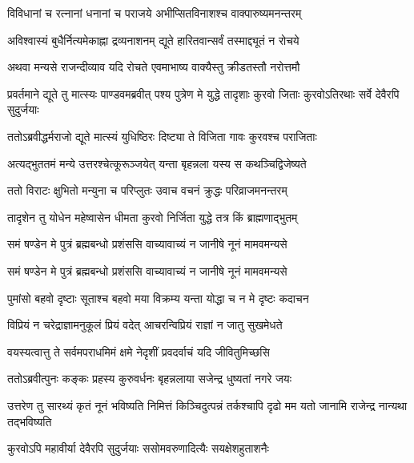 \twolineshloka
{विविधानां च रत्नानां धनानां च पराजये}
{अभीप्सितविनाशश्च वाक्पारुष्यमनन्तरम्}


\twolineshloka
{अविश्वास्यं बुधैर्नित्यमेकाह्ना द्रव्यनाशनम्}
{द्यूते हारितवान्सर्वं तस्माद्द्यूतं न रोचये}


\twolineshloka
{अथवा मन्यसे राजन्दीव्याव यदि रोचते}
{एवमाभाष्य वाक्यैस्तु क्रीडतस्तौ नरोत्तमौ}


\onelineshloka
{प्रवर्तमाने द्यूते तु मात्स्यः पाण्डवमब्रवीत्}
\twolineshloka
{पश्य पुत्रेण मे युद्धे तादृशाः कुरवो जिताः}
{कुरवोऽतिरथाः सर्वे देवैरपि सुदुर्जयाः}


\twolineshloka
{ततोऽब्रवीद्धर्मराजो द्यूते मात्स्यं युधिष्ठिरः}
{दिष्ट्या ते विजिता गावः कुरवश्च पराजिताः}


\twolineshloka
{अत्यद्भुततमं मन्ये उत्तरश्चेत्कूरूञ्जयेत्}
{यन्ता बृहन्नला यस्य स कथञ्चिद्विजेष्यते}


\twolineshloka
{ततो विराटः क्षुभितो मन्युना च परिप्लुतः}
{उवाच वचनं क्रुद्धः परिव्राजमनन्तरम्}


\twolineshloka
{तादृशेन तु योधेन महेष्वासेन धीमता}
{कुरवो निर्जिता युद्धे तत्र किं ब्राह्मणाद्भुतम्}




\twolineshloka
{समं षण्डेन मे पुत्रं ब्रह्मबन्धो प्रशंससि}
{वाच्यावाच्यं न जानीषे नूनं मामवमन्यसे}




\twolineshloka
{समं षण्डेन मे पुत्रं ब्रह्मबन्धो प्रशंससि}
{वाच्यावाच्यं न जानीषे नूनं मामवमन्यसे}


\twolineshloka
{पुमांसो बहवो दृष्टाः सूताश्च बहवो मया}
{विक्रम्य यन्ता योद्धा च न मे दृष्टः कदाचन}


\twolineshloka
{विप्रियं न चरेद्राज्ञामनुकूलं प्रियं वदेत्}
{आचरन्विप्रियं राज्ञां न जातु सुखमेधते}


\twolineshloka
{वयस्यत्वात्तु ते सर्वमपराधमिमं क्षमे}
{नेदृशीं प्रवदर्वाचं यदि जीवितुमिच्छसि}



\twolineshloka
{ततोऽब्रवीत्पुनः कङ्कः प्रहस्य कुरुवर्धनः}
{बृहन्नलाया सजेन्द्र धुष्यतां नगरे जयः}


\threelineshloka
{उत्तरेण तु सारथ्यं कृतं नूनं भविष्यति}
{निमित्तं किञ्चिदुत्पन्नं तर्कश्चापि दृढो मम}
{यतो जानामि राजेन्द्र नान्यथा तद्भविष्यति}


\twolineshloka
{कुरवोऽपि महावीर्या देवैरपि सुदुर्जयाः}
{ससोमवरुणादित्यैः सयक्षेशहुताशनैः}


